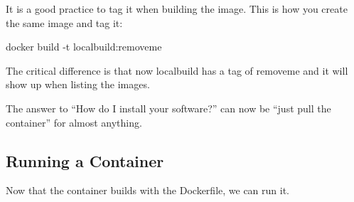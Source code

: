 It is a good practice to tag it when building the
image. This is how you create the same image and tag it:

docker build -t localbuild:removeme

The critical difference is that now localbuild has a tag
of removeme and it will show up when listing the images.

The answer to “How do I install your software?”
can now be “just pull the container” for almost anything.


\subsection*{Running a Container}
Now that the container builds with the Dockerfile, we
can run it.





